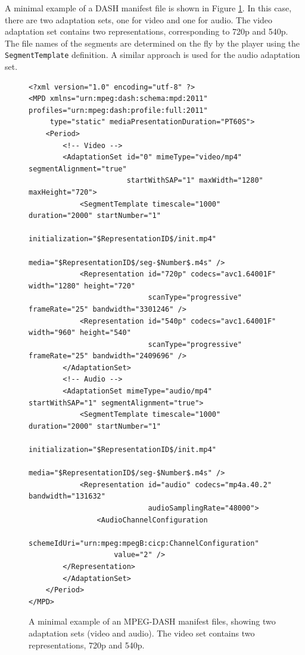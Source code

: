 A minimal example of a DASH manifest file is shown in Figure \ref{fig:dash_manifest}. In this case, there are two adaptation sets, one for video and one for audio. The video adaptation set contains two representations, corresponding to 720p and 540p. The file names of the segments are determined on the fly by the player using the \texttt{SegmentTemplate} definition. A similar approach is used for the audio adaptation set.

\begin{figure}[h]
    \centering
    \begin{verbatim}
<?xml version="1.0" encoding="utf-8" ?>
<MPD xmlns="urn:mpeg:dash:schema:mpd:2011" profiles="urn:mpeg:dash:profile:full:2011"
     type="static" mediaPresentationDuration="PT60S">
    <Period>
        <!-- Video -->
        <AdaptationSet id="0" mimeType="video/mp4" segmentAlignment="true"
                       startWithSAP="1" maxWidth="1280" maxHeight="720">
            <SegmentTemplate timescale="1000" duration="2000" startNumber="1"
                             initialization="$RepresentationID$/init.mp4"
                             media="$RepresentationID$/seg-$Number$.m4s" />
            <Representation id="720p" codecs="avc1.64001F" width="1280" height="720"
                            scanType="progressive" frameRate="25" bandwidth="3301246" />
            <Representation id="540p" codecs="avc1.64001F" width="960" height="540"
                            scanType="progressive" frameRate="25" bandwidth="2409696" />
        </AdaptationSet>
        <!-- Audio -->
        <AdaptationSet mimeType="audio/mp4" startWithSAP="1" segmentAlignment="true">
            <SegmentTemplate timescale="1000" duration="2000" startNumber="1"
                             initialization="$RepresentationID$/init.mp4"
                             media="$RepresentationID$/seg-$Number$.m4s" />
            <Representation id="audio" codecs="mp4a.40.2" bandwidth="131632"
                            audioSamplingRate="48000">
                <AudioChannelConfiguration
                    schemeIdUri="urn:mpeg:mpegB:cicp:ChannelConfiguration"
                    value="2" />
        </Representation>
        </AdaptationSet>
    </Period>
</MPD>
    \end{verbatim}
    \caption{A minimal example of an MPEG-DASH manifest files, showing two adaptation sets (video and audio). The video set contains two representations, 720p and 540p.}
    \label{fig:dash_manifest}
\end{figure}

